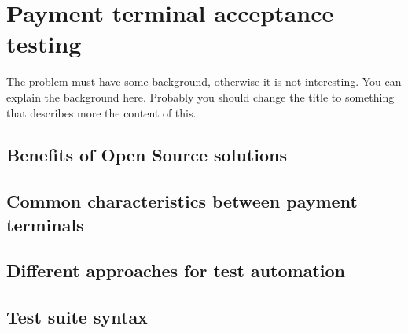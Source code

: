 
\chapter{Payment terminal acceptance testing}
\label{chapter:Payment terminal acceptance testing} 

The problem must have some background, otherwise it is not
interesting.  You can explain the background here. Probably you should
change the title to something that describes more the content of this.

\section{Benefits of Open Source solutions}



\section{Common characteristics between payment terminals}



\section{Different approaches for test automation}



\section{Test suite syntax}


